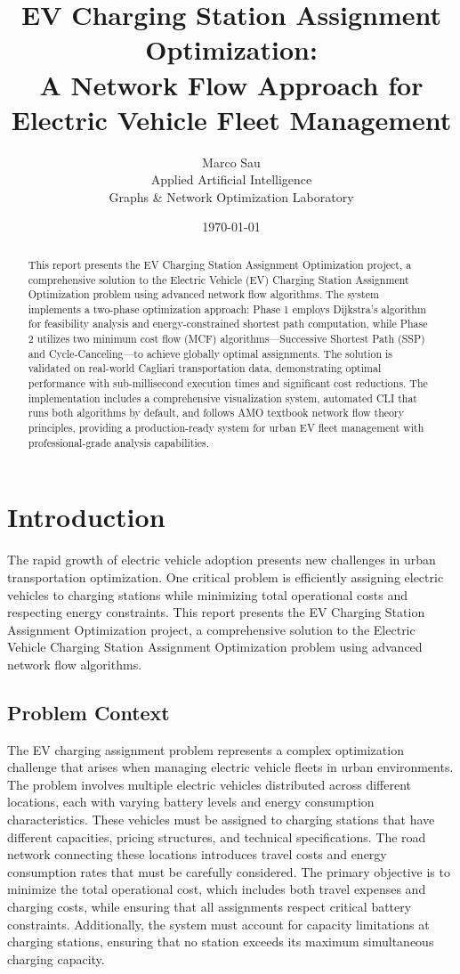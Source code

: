 \documentclass[12pt,a4paper]{article}
\title{\textbf{EV Charging Station Assignment Optimization:\\A Network Flow Approach for Electric Vehicle Fleet Management}}
\author{Marco Sau\\Applied Artificial Intelligence\\Graphs \& Network Optimization Laboratory}
\date{\today}
\begin{document}
\maketitle

\begin{abstract}
This report presents the EV Charging Station Assignment Optimization project, a comprehensive solution to the Electric Vehicle (EV) Charging Station Assignment Optimization problem using advanced network flow algorithms. The system implements a two-phase optimization approach: Phase 1 employs Dijkstra's algorithm for feasibility analysis and energy-constrained shortest path computation, while Phase 2 utilizes two minimum cost flow (MCF) algorithms—Successive Shortest Path (SSP) and Cycle-Canceling—to achieve globally optimal assignments. The solution is validated on real-world Cagliari transportation data, demonstrating optimal performance with sub-millisecond execution times and significant cost reductions. The implementation includes a comprehensive visualization system, automated CLI that runs both algorithms by default, and follows AMO textbook network flow theory principles, providing a production-ready system for urban EV fleet management with professional-grade analysis capabilities.
\end{abstract}

\tableofcontents
\newpage

\section{Introduction}

The rapid growth of electric vehicle adoption presents new challenges in urban transportation optimization. One critical problem is efficiently assigning electric vehicles to charging stations while minimizing total operational costs and respecting energy constraints. This report presents the EV Charging Station Assignment Optimization project, a comprehensive solution to the Electric Vehicle Charging Station Assignment Optimization problem using advanced network flow algorithms.

\subsection{Problem Context}

The EV charging assignment problem represents a complex optimization challenge that arises when managing electric vehicle fleets in urban environments. The problem involves multiple electric vehicles distributed across different locations, each with varying battery levels and energy consumption characteristics. These vehicles must be assigned to charging stations that have different capacities, pricing structures, and technical specifications. The road network connecting these locations introduces travel costs and energy consumption rates that must be carefully considered. The primary objective is to minimize the total operational cost, which includes both travel expenses and charging costs, while ensuring that all assignments respect critical battery constraints. Additionally, the system must account for capacity limitations at charging stations, ensuring that no station exceeds its maximum simultaneous charging capacity.
\end{document}
